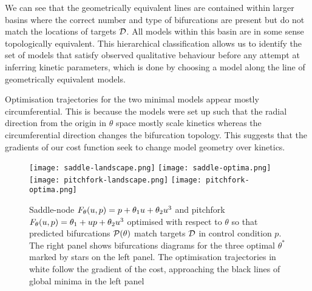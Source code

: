 We can see that the geometrically equivalent lines are contained within larger basins where the correct number and type of bifurcations are present but do not match the locations of targets $\mathcal{D}$. All models within this basin are in some sense topologically equivalent. This hierarchical classification allows us to identify the set of models that satisfy observed qualitative behaviour \cite{Stumpf2019ParameterBifurcations} before any attempt at inferring kinetic parameters, which is done by choosing a model along the line of geometrically equivalent models.

Optimisation trajectories for the two minimal models appear mostly circumferential. This is because the models were set up such that the radial direction from the origin in $\theta$ space mostly scale kinetics whereas the circumferential direction changes the bifurcation topology. This suggests that the gradients of our cost function seek to change model geometry over kinetics.

\begin{figure}
\centering
\texttt{[image: saddle-landscape.png]}
\texttt{[image: saddle-optima.png]}
\texttt{[image: pitchfork-landscape.png]}
\texttt{[image: pitchfork-optima.png]}
\caption{Saddle-node $F_{\theta}(u,p) = p + \theta_{1}u+\theta_{2}u^3$ and pitchfork $F_{\theta}(u,p) = \theta_{1} + u p +\theta_{2}u^3$ optimised with respect to $\theta$ so that predicted bifurcations $\mathcal{P}(\theta)$ match targets $\mathcal{D}$ in control condition $p$. The right panel shows bifurcations diagrams for the three optimal $\theta^*$ marked by stars on the left panel. The optimisation trajectories in white follow the gradient of the cost, approaching the black lines of global minima in the left panel}
\label{fig:minimal-models:results}
\end{figure}

